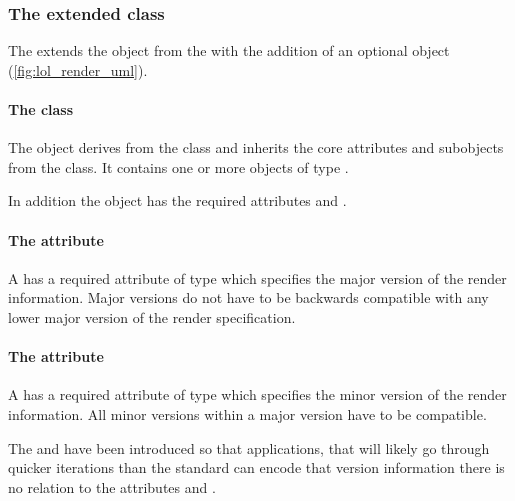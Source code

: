 

\subsubsection{The extended  class}
\label{listoflayouts-class}

The \RenderPackage extends the  object from the \LayoutPackage with the
addition of an optional \ListOfGlobalRenderInformation object (\ref{fig:lol_render_uml}).

\paragraph{The  class}
\label{listofglobalrenderinformation-class}

The \ListOfGlobalRenderInformation object derives from the
 class and inherits the core attributes and subobjects from the
 class. It contains one or more objects of type
\GlobalRenderInformation.

In addition the \ListOfGlobalRenderInformation object has the required attributes  and .

\paragraph{The \fixttspace{} attribute}

A \ListOfGlobalRenderInformation has a required attribute
 of type  which specifies the major version of the render information. Major versions do not have to be backwards compatible with any lower major version of the render specification.

\paragraph{The \fixttspace{} attribute}

A \ListOfGlobalRenderInformation has a required attribute
 of type  which specifies the minor version of the render information.  All minor versions within a major version have to be compatible.

The  and  have been introduced so that 
applications, that will likely go through quicker iterations than the \SBML standard
can encode that version information there is no relation to the \SBML attributes 
 and . 


